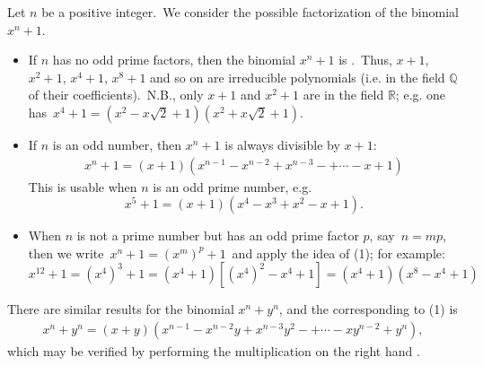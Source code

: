 \documentclass[12pt]{article}
\theoremstyle{definition}
\begin{document}
Let $n$ be a positive integer.\, We consider the possible factorization of the binomial $x^n\!+\!1$.

\begin{itemize}
 \item If $n$ has no odd prime factors, then the binomial $x^n\!+\!1$ is .\, Thus, $x\!+\!1$, $x^2\!+\!1$, $x^4\!+\!1$, $x^8\!+\!1$ and so on are irreducible polynomials (i.e.  in the field $\mathbb{Q}$ of their coefficients).\, N.B., only $x\!+\!1$ and $x^2\!+\!1$ are  in the field $\mathbb{R}$; e.g. one has\, $x^4\!+\!1 = (x^2\!-\!x\sqrt{2}\!+\!1)(x^2\!+\!x\sqrt{2}\!+\!1)$.
 \item If $n$ is an odd number, then $x^n\!+\!1$ is always divisible by $x\!+\!1$:
  \begin{align}
         x^n+1 = (x+1)(x^{n-1}-x^{n-2}+x^{n-3}-+\cdots-x+1)
  \end{align}
This  is usable when $n$ is an odd prime number, e.g.
              $$x^5+1 = (x+1)(x^4-x^3+x^2-x+1).$$
 \item When $n$ is not a prime number but has an odd prime factor $p$, say\,
 $n = mp$,\, then we write\, $x^n\!+\!1 = (x^m)^p\!+\!1$\, and apply the idea of (1); for example:
   $$x^{12}+1 = (x^4)^3+1 = (x^4+1)[(x^4)^2-x^4+1] = (x^4+1)(x^8-x^4+1)$$
\end{itemize}

There are similar results for the binomial $x^n\!+\!y^n$, and the  corresponding to (1) is
  \begin{align}
         x^n+y^n = (x+y)(x^{n-1}-x^{n-2}y+x^{n-3}y^2-+\cdots-xy^{n-2}+y^n),
  \end{align}
which may be verified by performing the multiplication on the right hand .
\end{document}
